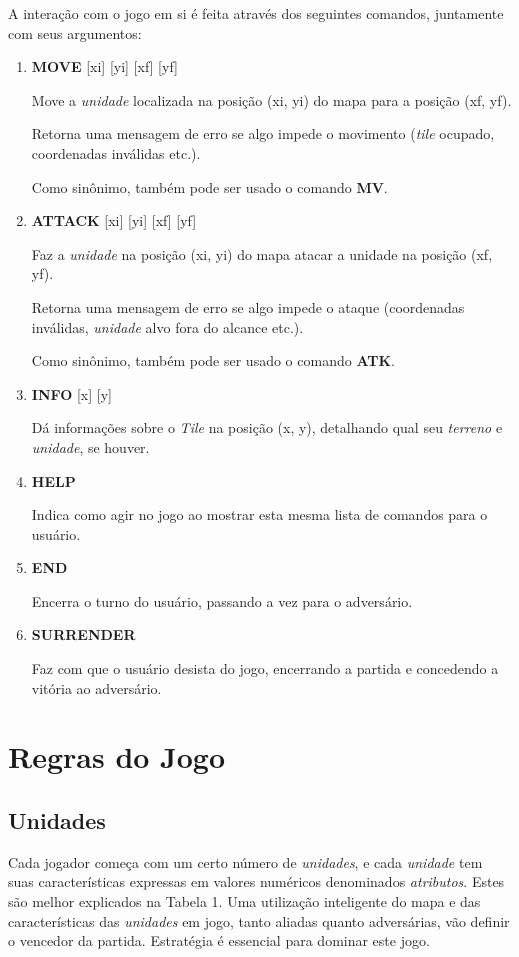 \documentclass{article}
\begin{document}
        A interação com o jogo em si é feita através dos seguintes comandos, juntamente com seus argumentos:
        \begin{enumerate}
        \item \textbf{MOVE} [xi] [yi] [xf] [yf]\par
            Move a \emph{unidade} localizada na posição (xi, yi) do mapa para a posição (xf, yf). \par
            Retorna uma mensagem de erro se algo impede o movimento (\emph{tile} ocupado, coordenadas inválidas etc.). \par
            Como sinônimo, também pode ser usado o comando \textbf{MV}.
        \item \textbf{ATTACK} [xi] [yi] [xf] [yf]\par
            Faz a \emph{unidade} na posição (xi, yi) do mapa atacar a unidade na posição (xf, yf). \par
            Retorna uma mensagem de erro se algo impede o ataque (coordenadas inválidas, \emph{unidade} alvo fora do alcance etc.). \par
            Como sinônimo, também pode ser usado o comando \textbf{ATK}.
        \item \textbf{INFO} [x] [y]\par
            Dá informações sobre o \emph{Tile} na posição (x, y), detalhando qual seu \emph{terreno} e \emph{unidade}, se houver.
        \item \textbf{HELP} \par
            Indica como agir no jogo ao mostrar esta mesma lista de comandos para o usuário.
        \item \textbf{END} \par
            Encerra o turno do usuário, passando a vez para o adversário.
        \item \textbf{SURRENDER} \par
            Faz com que o usuário desista do jogo, encerrando a partida e concedendo a vitória ao adversário.
        \end{enumerate}

\section{Regras do Jogo}

\subsection{Unidades}
Cada jogador começa com um certo número de \emph{unidades}, e cada \emph{unidade} tem suas características expressas em valores numéricos denominados \emph{atributos}. Estes são melhor explicados na Tabela 1. Uma utilização inteligente do mapa e das características das \emph{unidades} em jogo, tanto aliadas quanto adversárias, vão definir o vencedor da partida. Estratégia é essencial para dominar este jogo. \par
\end{document}
